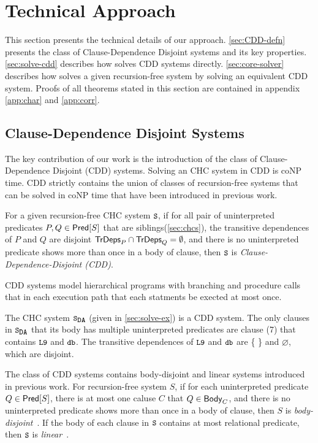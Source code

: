 \section{Technical Approach}
\label{sec:approach}
%
This section presents the technical details of our approach.
%
\autoref{sec:CDD-defn} presents the class of Clause-Dependence Disjoint
systems and its key properties.
%
\autoref{sec:solve-cdd} describes how \sys solves CDD systems
directly.
%
\autoref{sec:core-solver} describes how \sys solves a given
recursion-free system by solving an equivalent CDD system.
%
Proofs of all theorems stated in this section are contained in appendix
\autoref{app:char} and \autoref{app:corr}.

\subsection{Clause-Dependence Disjoint Systems}
\label{sec:CDD-defn}
%
The key contribution of our work is the introduction of the class of
Clause-Dependence Disjoint (CDD) systems.
%
Solving an CHC system in CDD is coNP time.
%
CDD strictly contains
the union of classes of recursion-free systems that can be solved
in coNP time that have been introduced in previous work.
%
\begin{defn}
  \label{defn:cdds}
  For a given recursion-free CHC system $\cc{S}$,
  if for all pair of uninterpreted predicates $P, Q \in \mathsf{Pred}[ S ]$ that are siblings(\autoref{sec:chcs}), the 
  transitive dependences of $P$ and $Q$ are disjoint $\mathsf{TrDeps}_{P} \cap \mathsf{TrDeps}_{Q} = \emptyset$, and there is 
  no uninterpreted predicate shows more than once in a body of clause, then $\cc{S}$ is
  \emph{Clause-Dependence-Disjoint (CDD)}.
\end{defn}
%
CDD systems model hierarchical programs with branching and
procedure calls that in each execution path that each statments be
exected at most once.
%
\begin{ex}
  The CHC system $\mcchc$ (given in \autoref{sec:solve-ex}) is a CDD
  system.
  The only clauses in $\mcchc$ that its body has multiple uninterpreted
  predicates are clause (7) that contains $\cc{L9}$ and $\cc{db}$.
  The transitive dependences of $\cc{L9}$ and $\cc{db}$ are \{\,\,\} and $\varnothing$, which are disjoint.
\end{ex}

The class of CDD systems contains body-disjoint and linear
systems introduced in previous work.
%
For recursion-free system $S$, if for each uninterpreted predicate
$Q \in \mathsf{Pred}[ S ]$, there is at most one caluse $C$ that $Q \in \mathsf{Body}_{C}$,
and there is no uninterpreted predicate shows more than once in a body of clause, then
$S$ is \emph{body-disjoint}~\cite{rummer13a,rummer13b}.
%
If the body of each clause in $\cc{S}$ contains at most
relational predicate, then $\cc{S}$ is
\emph{linear}~\cite{albarghouthi12a}.


